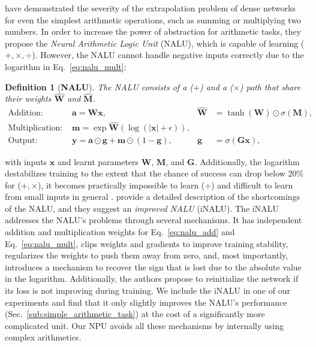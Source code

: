 \documentclass[9pt]{article}
\newtheorem*{definition}{Definition}
\begin{document}
\citet{trask_neural_2018} have demonstrated the severity of the extrapolation
problem of dense networks for even the simplest arithmetic operations, such as
summing or multiplying two numbers.  In order to increase the power of
abstraction for arithmetic tasks, they propose the \emph{Neural Arithmetic
Logic Unit} (NALU), which is capable of learning ($+,\times,\div$).  However,
the NALU cannot handle negative inputs correctly due to the logarithm in
Eq.~\ref{eq:nalu_mult}:
\begin{definition}[{\bf NALU}]
  The NALU consists of a ($+$) and a ($\times$) path that share their weights $\bm{\hat{W}}$ and $\bm{\hat{M}}$.
\begin{align}
  \label{eq:nalu_add}
  \text{Addition: }       & \bm a = \bm W \bm x,
                          & \bm{\hat W}& = \tanh(\bm{W}) \odot \sigma(\bm{M}), \\
  \label{eq:nalu_mult}
  \text{Multiplication: } & \bm m = \exp \bm{\hat W}(\log(|\bm x|+\epsilon)), & &\\
  \text{Output: }         & \bm y = \bm a \odot \bm g + \bm m \odot (1-\bm g),
                          & \bm g& = \sigma(\bm G\bm x),
\end{align}
\end{definition}
with inputs $\bm x$ and learnt parameters $\bm W$, $\bm M$, and $\bm G$.
Additionally, the logarithm destabilizes training to the extent that the chance of success
can drop below 20\% for ($+,\times$), it becomes practically impossible to
learn ($\div$) and difficult to learn from small inputs in general
\citep{madsen_measuring_2019}.
\cite{schlor_inalu_2020} provide a detailed description of the shortcomings of
the NALU, and they suggest an \emph{improved NALU} (iNALU).  The iNALU addresses
the NALU's problems through several mechanisms.  It has independent
addition and multiplication weights for Eq.~\ref{eq:nalu_add} and
Eq.~\ref{eq:nalu_mult}, clips weights and gradients to improve training
stability, regularizes the weights to push them away from zero, and, most
importantly, introduces a mechanism to recover the sign that is lost due to the
absolute value in the logarithm. Additionally, the authors propose to
reinitialize the network if its loss is not improving during training.  We
include the iNALU in one of our experiments and find that it only slightly
improves the NALU's performance (Sec.~\ref{sub:simple_arithmetic_task}) at the
cost of a significantly more complicated unit. Our NPU avoids all these mechanisms
by internally using complex arithmetics.
\end{document}
